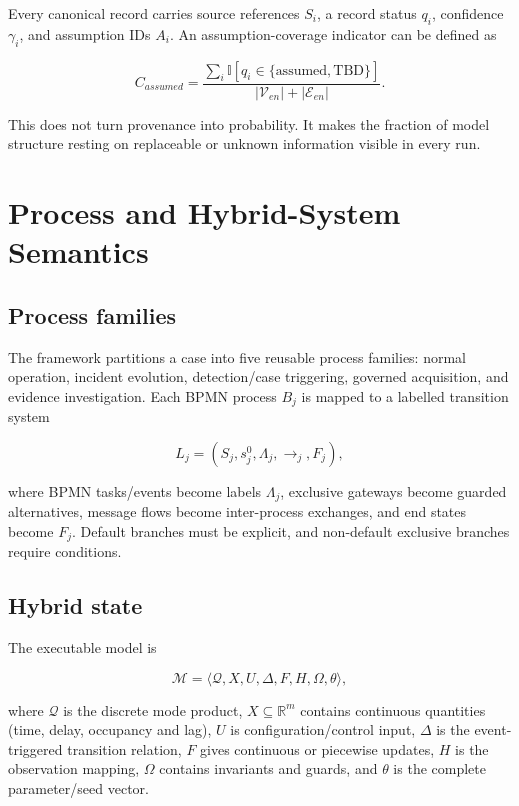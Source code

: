 ﻿\documentclass[10pt,a4paper,twocolumn]{article}
\newcommand{\R}{\mathbb{R}}
\newcommand{\indicator}{\mathbb{I}}
\begin{document}
Every canonical record carries source references \(S_i\), a record status \(q_i\), confidence \(\gamma_i\), and assumption IDs \(A_i\). An assumption-coverage indicator can be defined as

\begin{equation}
C_{assumed}=\frac{\sum_i\indicator[q_i\in\{\text{assumed},\text{TBD}\}]}{|\mathcal{V}_{en}|+|\mathcal{E}_{en}|}.
\end{equation}

This does not turn provenance into probability. It makes the fraction of model structure resting on replaceable or unknown information visible in every run.

\section{Process and Hybrid-System Semantics}

\subsection{Process families}

The framework partitions a case into five reusable process families: normal operation, incident evolution, detection/case triggering, governed acquisition, and evidence investigation. Each BPMN process \(B_j\) is mapped to a labelled transition system

\begin{equation}
L_j=(S_j,s_j^0,\Lambda_j,\rightarrow_j,F_j),
\end{equation}

where BPMN tasks/events become labels \(\Lambda_j\), exclusive gateways become guarded alternatives, message flows become inter-process exchanges, and end states become \(F_j\). Default branches must be explicit, and non-default exclusive branches require conditions.

\subsection{Hybrid state}

The executable model is

\begin{equation}
\mathcal{M}=\langle\mathcal{Q},X,U,\Delta,F,H,\Omega,\theta\rangle,
\label{eq:hybrid}
\end{equation}

where \(\mathcal{Q}\) is the discrete mode product, \(X\subseteq\R^m\) contains continuous quantities (time, delay, occupancy and lag), \(U\) is configuration/control input, \(\Delta\) is the event-triggered transition relation, \(F\) gives continuous or piecewise updates, \(H\) is the observation mapping, \(\Omega\) contains invariants and guards, and \(\theta\) is the complete parameter/seed vector.
\end{document}
